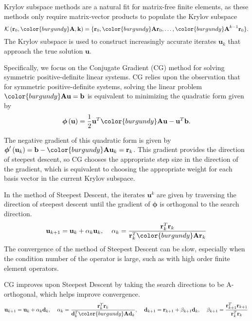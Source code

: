 Krylov subspace methods are a natural fit for matrix-free finite elements, as these methods only require matrix-vector products to populate the Krylov subspace
\begin{equation}
\mathcal{K} \left( \mathbf{r}_0, {\color{burgundy}\mathbf{A}}, \mathbf{k} \right) = \lbrace \mathbf{r}_0, {\color{burgundy}\mathbf{A}} \mathbf{r}_0, \dots, {\color{burgundy}\mathbf{A}}^{k - 1} \mathbf{r}_0 \rbrace.
\label{krylov_space}
\end{equation}
The Krylov subspace is used to construct increasingly accurate iterates $\mathbf{u}_k$ that approach the true solution $\mathbf{u}$.

Specifically, we focus on the Conjugate Gradient (CG) method \cite{hestenes1952methods, shewchuk1994introduction} for solving symmetric positive-definite linear systems.
CG relies upon the observation that for symmetric positive-definite systems, solving the linear problem ${\color{burgundy}\mathbf{A}} \mathbf{u} = \mathbf{b}$ is equivalent to minimizing the quadratic form given by
\begin{equation}
\boldsymbol{\phi} \left( \mathbf{u} \right) = \frac{1}{2} \mathbf{u}^T {\color{burgundy}\mathbf{A}} \mathbf{u} - \mathbf{u}^T \mathbf{b}.
\end{equation}

The negative gradient of this quadratic form is given by $\boldsymbol{\phi}' \left( \mathbf{u}_k \right) = \mathbf{b} - {\color{burgundy}\mathbf{A}} \mathbf{u}_k = \mathbf{r}_k$.
This gradient provides the direction of steepest descent, so CG chooses the appropriate step size in the direction of the gradient, which is equivalent to choosing the appropriate weight for each basis vector in the current Krylov subspace.

In the method of Steepest Descent, the iterates $\mathbf{u}^k$ are given by traversing the direction of steepest descent until the gradient of $\boldsymbol{\phi}$ is orthogonal to the search direction.
\begin{equation}
\mathbf{u}_{k + 1} = \mathbf{u}_k + \alpha_k \mathbf{u}_k, \hspace{4mm}
\alpha_k = \frac{\mathbf{r}_k^T \mathbf{r}_k}{\mathbf{r}_k^T {\color{burgundy}\mathbf{A}} \mathbf{r}_k}
\end{equation}
The convergence of the method of Steepest Descent can be slow, especially when the condition number of the operator is large, such as with high order finite element operators.

CG improves upon Steepest Descent by taking the search directions to be A-orthogonal, which helps improve convergence.
\begin{equation}
\mathbf{u}_{k + 1} = \mathbf{u}_k + \alpha_k \mathbf{d}_k, \hspace{4mm}
\alpha_k  = \frac{\mathbf{r}_k^T \mathbf{r}_k}{\mathbf{d}_k^T {\color{burgundy}\mathbf{A}} \mathbf{d}_k}, \hspace{4mm}
\mathbf{d}_{k + 1} = \mathbf{r}_{k + 1} + \beta_{k + 1} \mathbf{d}_k, \hspace{4mm}
\beta_{k + 1} = \frac{\mathbf{r}_{k + 1}^T \mathbf{r}_{k + 1}}{\mathbf{r}_k^T \mathbf{r}_k}
\end{equation}

